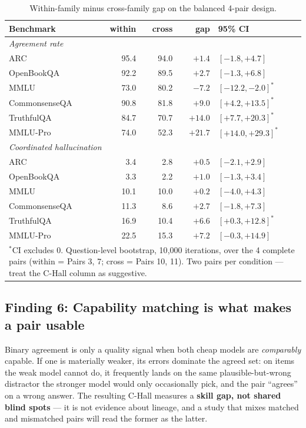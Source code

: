 \documentclass[conference]{IEEEtran}
\begin{document}
\begin{table}[!t]
\caption{Within-family minus cross-family gap on the balanced 4-pair design.}
\label{tab:family}
\renewcommand{\arraystretch}{1.15}
\begin{tabular}{l r r r l}
\toprule
\textbf{Benchmark} & \textbf{within} & \textbf{cross} & \textbf{gap} & \textbf{95\% CI} \\
\midrule
\multicolumn{5}{l}{\textit{Agreement rate}} \\
ARC & 95.4 & 94.0 & $+1.4$ & $[-1.8,+4.7]$ \\
OpenBookQA & 92.2 & 89.5 & $+2.7$ & $[-1.3,+6.8]$ \\
MMLU & 73.0 & 80.2 & $-7.2$ & $[-12.2,-2.0]^\ast$ \\
CommonsenseQA & 90.8 & 81.8 & $+9.0$ & $[+4.2,+13.5]^\ast$ \\
TruthfulQA & 84.7 & 70.7 & $+14.0$ & $[+7.7,+20.3]^\ast$ \\
MMLU-Pro & 74.0 & 52.3 & $+21.7$ & $[+14.0,+29.3]^\ast$ \\
\midrule
\multicolumn{5}{l}{\textit{Coordinated hallucination}} \\
ARC & 3.4 & 2.8 & $+0.5$ & $[-2.1,+2.9]$ \\
OpenBookQA & 3.3 & 2.2 & $+1.0$ & $[-1.3,+3.4]$ \\
MMLU & 10.1 & 10.0 & $+0.2$ & $[-4.0,+4.3]$ \\
CommonsenseQA & 11.3 & 8.6 & $+2.7$ & $[-1.8,+7.3]$ \\
TruthfulQA & 16.9 & 10.4 & $+6.6$ & $[+0.3,+12.8]^\ast$ \\
MMLU-Pro & 22.5 & 15.3 & $+7.2$ & $[-0.3,+14.9]$ \\
\bottomrule
\multicolumn{5}{p{8.4cm}}{\footnotesize $^\ast$CI excludes 0. Question-level bootstrap, 10{,}000 iterations, over the 4 complete pairs (within = Pairs 3, 7; cross = Pairs 10, 11). Two pairs per condition --- treat the C-Hall column as suggestive.}
\end{tabular}
\end{table}


\subsection{Finding 6: Capability matching is what makes a pair usable}
\label{sec:capmatch}
Binary agreement is only a quality signal when both cheap models are
\textit{comparably} capable. If one is materially weaker, its errors dominate the
agreed set: on items the weak model cannot do, it frequently lands on the same
plausible-but-wrong distractor the stronger model would only occasionally pick,
and the pair ``agrees'' on a wrong answer. The resulting C-Hall measures a
\textbf{skill gap, not shared blind spots} --- it is not evidence about lineage,
and a study that mixes matched and mismatched pairs will read the former as the
latter.
\end{document}
